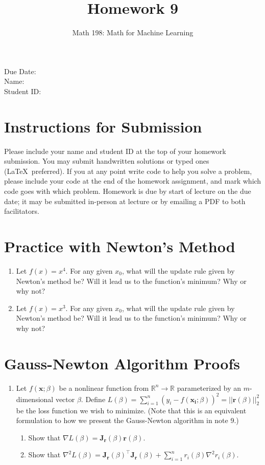 \documentclass{article}
\title{Homework 9}
\author{Math 198: Math for Machine Learning}
\date{}
\begin{document}
\maketitle

\noindent
Due Date:  \\
Name: \\
Student ID:

\section*{Instructions for Submission}
Please include your name and student ID at the top of your homework submission. You may submit handwritten solutions or typed ones (\LaTeX\ preferred). If you at any point write code to help you solve a problem, please include your code at the end of the homework assignment, and mark which code goes with which problem. Homework is due by start of lecture on the due date; it may be submitted in-person at lecture or by emailing a PDF to both facilitators.

\section{Practice with Newton's Method}
\begin{enumerate}[label=\arabic*.]
\item Let $f(x) = x^4$. For any given $x_0$, what will the update rule given by Newton's method be? Will it lead us to the function's minimum? Why or why not?
\item Let $f(x) = x^3$. For any given $x_0$, what will the update rule given by Newton's method be? Will it lead us to the function's minimum? Why or why not?
\end{enumerate}

\section{Gauss-Newton Algorithm Proofs}
\begin{enumerate}[label=\arabic*.]
\item Let $f(\mathbf{x}; \beta)$ be a nonlinear function from $\mathbb{R}^n \rightarrow \mathbb{R}$ parameterized by an $m$-dimensional vector $\beta$. Define $L(\beta) = \sum_{i=1}^n (y_i - f(\mathbf{x_i}; \beta))^2 = ||\mathbf{r}(\beta)||_2^2$ be the loss function we wish to minimize. (Note that this is an equivalent formulation to how we present the Gauss-Newton algorithm in note 9.)
\begin{enumerate}[label=(\alph*)]
\item Show that $\nabla L(\beta) = \mathbf{J_r}(\beta)\mathbf{r}(\beta)$.
\item Show that $\nabla^2 L(\beta) = \mathbf{J_r}(\beta)^\top\mathbf{J_r}(\beta) + \sum_{i=1}^n r_i(\beta) \nabla^2 r_i(\beta)$.
\end{enumerate}
\end{enumerate}
\end{document}
